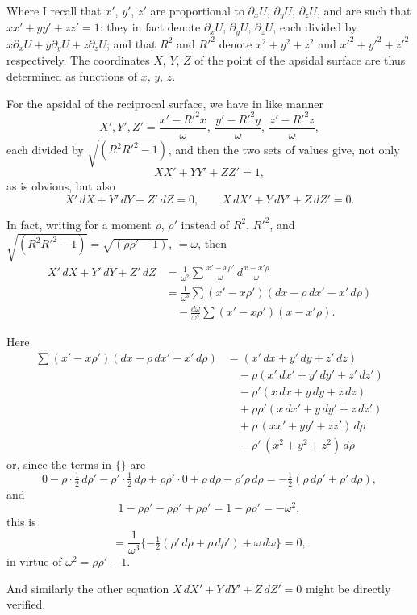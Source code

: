 \documentclass[11pt,a4paper]{book}
\begin{document}
Where I recall that $x'$, $y'$, $z'$ are proportional to
$\partial_xU$, $\partial_yU$, $\partial_zU$, and are such that $xx'+yy'+zz'=1$:
they in fact denote $\partial_xU$, $\partial_yU$, $\partial_zU$, each divided by
$x\partial_xU+y\partial_yU+z\partial_zU$; and that $R^2$ and $R'^2$ denote
$x^2+y^2+z^2$ and $x'^2+y'^2+z'^2$ respectively. The coordinates
$X$, $Y$, $Z$ of the point of the apsidal surface are thus determined as
functions of $x$, $y$, $z$.

For the apsidal of the reciprocal surface, we have in like manner
\[
X',Y',Z' = \frac{x'-R'^2x}{\omega},\ \frac{y'-R'^2y}{\omega},\ \frac{z'-R'^2z}{\omega},
\]
each divided by $\sqrt{(R^2R'^2-1)}$,
and then the two sets of values give, not only
\[
XX'+YY'+ZZ'=1,
\]
as is obvious, but also
\[
X'\,dX+Y'\,dY+Z'\,dZ=0,\qquad
X\,dX'+Y\,dY'+Z\,dZ'=0.
\]

In fact, writing for a moment $\rho$, $\rho'$ instead of $R^2$, $R'^2$, and
$\sqrt{(R^2R'^2-1)}=\sqrt{(\rho\rho'-1)}$, $=\omega$, then
\begin{align*}
X'\,dX+Y'\,dY+Z'\,dZ
&= \frac{1}{\omega^2}\sum\frac{x'-x\rho'}{\omega}\,d\frac{x-x'\rho}{\omega}\\
&= \frac{1}{\omega^3}\sum(x'-x\rho')(dx-\rho\,dx'-x'\,d\rho)\\
&\quad -\frac{d\omega}{\omega^4}\sum(x'-x\rho')(x-x'\rho).
\end{align*}

Here
\begin{align*}
\sum(x'-x\rho')(dx-\rho\,dx'-x'\,d\rho)
&= (x'\,dx+y'\,dy+z'\,dz)\\
&\quad -\rho(x'\,dx'+y'\,dy'+z'\,dz')\\
&\quad -\rho'(x\,dx+y\,dy+z\,dz)\\
&\quad +\rho\rho'(x\,dx'+y\,dy'+z\,dz')\\
&\quad +\rho\,(xx'+yy'+zz')\,d\rho\\
&\quad -\rho'\,(x^2+y^2+z^2)\,d\rho
\end{align*}
or, since the terms in $\{\}$ are
\[
0-\rho\cdot\tfrac{1}{2}\,d\rho' - \rho'\cdot\tfrac{1}{2}\,d\rho
+\rho\rho'\cdot 0 + \rho\,d\rho - \rho'\rho\,d\rho
= -\tfrac{1}{2}(\rho\,d\rho'+\rho'\,d\rho),
\]
and
\[
1-\rho\rho'-\rho\rho'+\rho\rho' = 1-\rho\rho' = -\omega^2,
\]
this is
\[
= \frac{1}{\omega^3}\{-\tfrac{1}{2}(\rho'\,d\rho+\rho\,d\rho')+\omega\,d\omega\} = 0,
\]
in virtue of $\omega^2=\rho\rho'-1$.

And similarly the other equation $X\,dX'+Y\,dY'+Z\,dZ'=0$ might
be directly verified.
\end{document}
